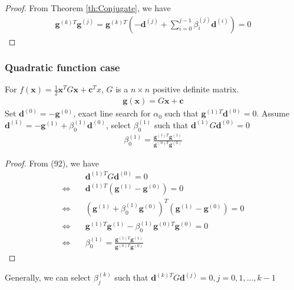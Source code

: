 \begin{proof}
    From Theorem \ref{th:Conjugate}, we have
    \begin{align}
        \mathbf{g}^{(k)T}\mathbf{g}^{(j)}
        = \mathbf{g}^{(k)T} (-\mathbf{d}^{(j)} 
        + \sum_{i=0}^{j-1}\beta_i^{(j)} \mathbf{d}^{(i)}) = 0
    \end{align}
    
\end{proof}
\subsubsection{Quadratic function case}
\par
For $f(\mathbf{x}) = \frac{1}{2}\mathbf{x}^T G \mathbf{x} + \mathbf{c}^T x$,
$G$ is a $n \times n$ positive definite matrix.
\begin{align}
    \mathbf{g}(\mathbf{x}) = G \mathbf{x} + \mathbf{c}
\end{align}
Set $\mathbf{d}^{(0)} = -\mathbf{g}^{(0)}$,
exact line search for $\alpha_0$ such that 
$\mathbf{g}^{(1)T}\mathbf{d}^{(0)} = 0$.
Assume $\mathbf{d}^{(1)} = -\mathbf{g}^{(1)} + \beta_0^{(1)}\mathbf{d}^{(0)}$,
select $\beta_0^{(1)}$ such that
$ \mathbf{d}^{(1)} G \mathbf{d}^{(0)} = 0$
\begin{align}
    \beta_0^{(1)} = \frac{\mathbf{g}^{(1)T}\mathbf{g}^{(1)}}
    {\mathbf{g}^{(0)T}\mathbf{g}^{(0)}}
\end{align}
\begin{proof}
    From (92), we have
    \begin{align}
        &\mathbf{d}^{(1)T} G \mathbf{d}^{(0)} = 0 \\
        \Leftrightarrow \quad&\mathbf{d}^{(1)T}
        (\mathbf{g}^{(1)} - \mathbf{g}^{(0)}) = 0 \\
        \Leftrightarrow  \quad&(\mathbf{g}^{(1)} + 
        \beta_0^{(1)}\mathbf{g}^{(0)})^T
        (\mathbf{g}^{(1)} - \mathbf{g}^{(0)}) = 0 \\
        \Leftrightarrow \quad&\mathbf{g}^{(1)T}\mathbf{g}^{(1)}
        - \beta_0^{(1)}\mathbf{g}^{(0)T}\mathbf{g}^{(0)} = 0 \\
        \Leftrightarrow \quad&\beta_0^{(1)} = 
        \frac{\mathbf{g}^{(1)T}\mathbf{g}^{(1)}}
        {\mathbf{g}^{(0)T}\mathbf{g}^{(0)}}
    \end{align}
    
\end{proof}
    Generally, we can select $\beta_j^{(k)}$ such that
    $\mathbf{d}^{(k)T} G \mathbf{d}^{(j)} = 0, j=0, 1,..., k-1$

